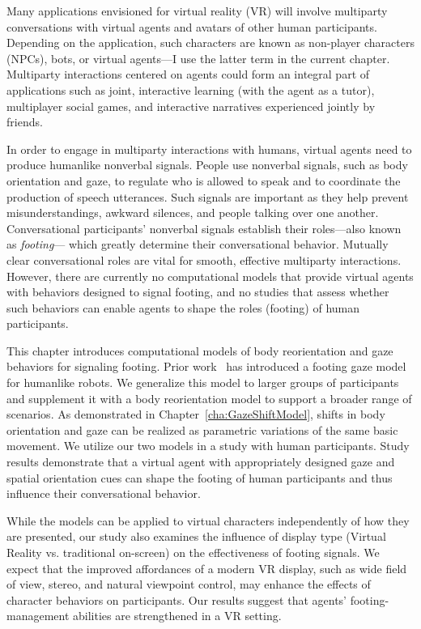 Many applications envisioned for virtual reality (VR) will involve multiparty conversations with virtual agents and avatars of other human participants.
Depending on the application, such characters are known as non-player characters (NPCs), bots, or virtual agents---I use the latter term in the current chapter.
Multiparty interactions centered on agents could form an integral part of applications such as joint, interactive learning (with the agent as a tutor), multiplayer social games, and interactive narratives experienced jointly by friends.

In order to engage in multiparty interactions with humans, virtual agents need to produce humanlike nonverbal signals.
People use nonverbal signals, such as body orientation and gaze, to regulate who is allowed to speak and to coordinate the production of speech utterances. Such signals are important as they help prevent misunderstandings, awkward silences, and people talking over one another. Conversational participants' nonverbal signals establish their roles---also known as \emph{footing}--- which greatly determine their conversational behavior.
Mutually clear conversational roles are vital for smooth, effective multiparty interactions.
However, there are currently no computational models that provide virtual agents with behaviors designed to signal footing, and no studies that assess whether such behaviors can enable agents to shape the roles (footing) of human participants.

This chapter introduces computational models of body reorientation and gaze behaviors for signaling footing. Prior work~\citep{mutlu2012conversational} has introduced a footing gaze model for humanlike robots. We generalize this model to larger groups of participants and supplement it with a body reorientation model to support a broader range of scenarios.
As demonstrated in Chapter~\ref{cha:GazeShiftModel}, shifts in body orientation and gaze can be realized as parametric variations of the same basic movement.
We utilize our two models in a study with human participants. Study results demonstrate that a virtual agent with appropriately designed gaze and spatial orientation cues can shape the footing of human participants and thus influence their conversational behavior.

While the models can be applied to virtual characters independently of how they are presented, our study also examines the influence of display type (Virtual Reality vs. traditional on-screen) on the effectiveness of footing signals. We expect that the improved affordances of a modern VR display, such as wide field of view, stereo, and natural viewpoint control, may enhance the effects of character behaviors on participants. Our results suggest that agents' footing-management abilities are strengthened in a VR setting.


